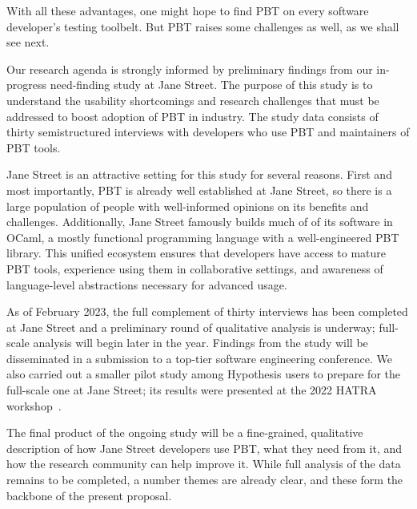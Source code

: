 \iflater{}\fi

With all these advantages, one might hope to find PBT on every
software developer's testing toolbelt.  But PBT raises some challenges
as well, as we shall see next.

%
Our research agenda is strongly informed by preliminary findings from
our in-progress need-finding study at Jane Street.  The purpose of this
study is to understand the usability shortcomings and research
challenges that must be addressed to boost adoption of PBT in
industry. The study data consists of thirty semistructured interviews
with developers who use PBT and maintainers of PBT tools.

Jane Street is
an attractive setting for this study for several reasons.  First and most
importantly, PBT is
already well established at Jane Street, so there is a large
population of people with well-informed opinions on its benefits and
challenges. Additionally, Jane Street famously builds much of of its
software in OCaml, a mostly functional programming language with
a well-engineered PBT library. This unified
ecosystem ensures that developers have access to mature PBT tools,
experience using them in collaborative settings,
and awareness of language-level abstractions necessary
for advanced usage.

As of February 2023, the full complement of thirty interviews has been
completed at Jane Street and a preliminary round of qualitative
analysis is underway; full-scale analysis will begin later in the year.
Findings from the study will be disseminated in a submission to a
top-tier software engineering conference.  We also carried out a
smaller pilot study among Hypothesis users to prepare for the
full-scale one at Jane Street; its results were presented at the
2022 HATRA workshop~\cite{goldstein_problems_2022}.

 The final product of
the ongoing study will be a fine-grained, qualitative description of how
Jane Street developers use PBT, what they need from it, and how the
research community can
help improve it.  While full analysis of the data remains
to be completed, a number themes are already clear, and these form the
backbone of the present proposal.

